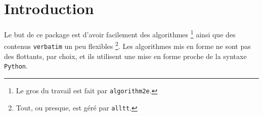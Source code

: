 \documentclass[12pt,a4paper]{article}
\begin{document}
\section{Introduction}

Le but de ce package est d'avoir facilement des algorithmes
\footnote{
	Le gros du travail est fait par \texttt{algorithm2e}.
}
ainsi que des contenus \verb+verbatim+ un peu flexibles
\footnote{
	Tout, ou presque, est géré par \texttt{alltt}.
}.
Les algorithmes mis en forme ne sont pas des flottants, par choix, et ils utilisent une mise en forme proche de la syntaxe \verb+Python+.
\end{document}
